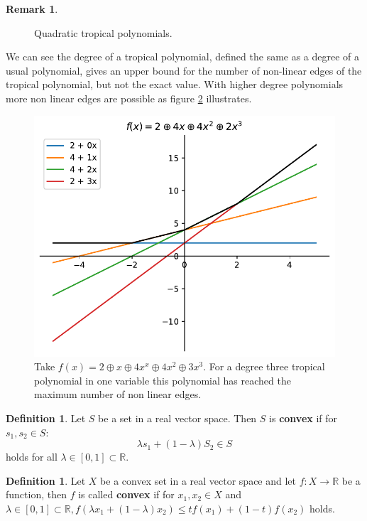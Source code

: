 \documentclass{article}
\theoremstyle{definition}
\newtheorem{definition}[theorem]{Definition}
\newtheorem{remark}[theorem]{Remark}
\begin{document}
\begin{remark}
\begin{figure}[h]
\caption{Quadratic tropical polynomials.}
\label{fig:image2}
\end{figure}

We can see the degree of a tropical polynomial, defined the same as a degree of a usual polynomial, gives an upper bound for the number of non-linear edges of the tropical polynomial, but not the exact value. With higher degree polynomials more non linear edges are possible as figure \ref{fig:trop_qub} illustrates.


\begin{figure}[h]
\centering
\includegraphics[scale=0.75]{graphics/third_trop_pol.pdf}
\caption{Take $f(x)=2 \oplus x \oplus 4x^{x} \oplus 4x^{2} \oplus 3x^{3}$. For a degree three tropical polynomial in one variable this polynomial has reached the maximum number of non linear edges.}
\label{fig:trop_qub}
\end{figure}
\end{remark}



\begin{definition}
Let $S$ be a set in a real vector space. Then $S$ is \textbf{convex} if for $s_{1}, s_{2} \in S$: 
$$\lambda s_{1} + (1-\lambda) S_{2} \in S$$
holds for all $\lambda \in [0,1] \subset \mathbb{R}$.
\end{definition}

\begin{definition}
Let $X$ be a convex set in a real vector space and let $f:X \to \mathbb{R}$ be a function, then $f$ is called \textbf{convex} if for $x_{1}, x_{2} \in X$ and $\lambda \in [0,1] \subset \mathbb{R}, f(\lambda x_{1} + (1-\lambda)x_{2}) \leq tf(x_{1}) + (1-t)f(x_{2})$ holds.
\end{definition}
\end{document}
